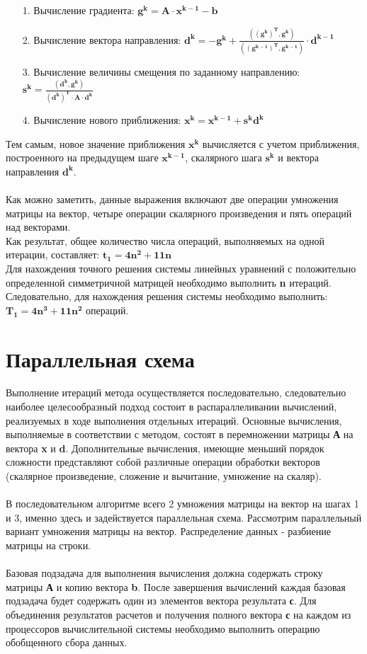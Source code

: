 \documentclass[12pt]{article}
\begin{document}
\begin{itemize}
	\item[1.] Вычисление градиента: $\mathbf{g^k = A \cdot x^{k-1} - b}$
	\item[2.] Вычисление вектора направления: 	
	$\mathbf{d^k = -g^k + \frac{((g^k)^T,g^k)}{((g^{k-1})^T, g^{k-1})} \cdot d^{k-1}}$
	\item[3.] Вычисление величины смещения по заданному направлению: $\mathbf{s^k = \frac{(d^k,g^k)}{(d^k)^T \cdot A \cdot d^k}}$ 
	\item[4.] Вычисление нового приближения: $\mathbf{x^k = x^{k-1} + s^kd^k}$
\end{itemize}
Тем самым, новое значение приближения $\mathbf{x^k}$ вычисляется с учетом приближения, построенного на предыдущем шаге $\mathbf{x^{k-1}}$, скалярного шага $\mathbf{s^k}$ и вектора направления $\mathbf{d^k}$.
\\\\
Как можно заметить, данные выражения включают две операции умножения матрицы на вектор, четыре операции скалярного произведения и пять операций над векторами. \\Как результат, общее количество числа операций, выполняемых на одной итерации, составляет: $\mathbf{t_1 = 4n^2 + 11n}$\\
Для нахождения точного решения системы линейных уравнений с положительно определенной симметричной матрицей необходимо выполнить \textbf{n} итераций.\\
Следовательно, для нахождения решения системы необходимо выполнить: $\mathbf{T_1 = 4n^3 + 11n^2}$ операций.

\section{\LARGE Параллельная схема}
Выполнение итераций метода осуществляется последовательно, следовательно наиболее целесообразный подход состоит в распараллеливании вычислений, реализуемых в ходе выполнения отдельных итераций. Основные вычисления, выполняемые в соответствии с методом, состоят в перемножении матрицы \textbf{А} на вектора \textbf{x} и \textbf{d}. Дополнительные вычисления, имеющие меньший порядок сложности представляют собой различные операции обработки векторов (скалярное произведение, сложение и вычитание, умножение на скаляр).
\\\\
В последовательном алгоритме всего 2 умножения матрицы на вектор на шагах 1 и 3, именно здесь и задействуется параллельная схема. Рассмотрим параллельный вариант умножения матрицы на вектор. Распределение данных - разбиение матрицы на строки.
\\\\
Базовая подзадача для выполнения вычисления должна содержать строку матрицы \textbf{А} и копию вектора \textbf{b}. После завершения вычислений каждая базовая подзадача будет содержать один из элементов вектора результата \textbf{с}. Для объединения результатов расчетов и получения полного вектора \textbf{с} на каждом из процессоров вычислительной системы необходимо выполнить операцию обобщенного сбора данных.
\end{document}
